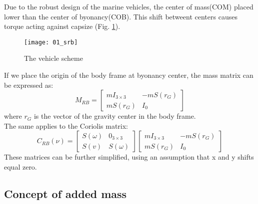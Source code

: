     Due to the robust design of the marine vehicles, the center of mass(COM) placed lower than the center of byonancy(COB).
    This shift betweent centers causes torque acting against capsize (Fig. \ref{image:scheme}).\\
    \begin{figure}[H]
        \centering\texttt{[image: 01\_srb]}
        \caption{The vehicle scheme}
        \label{image:scheme}
    \end{figure}
    If we place the origin of the body frame at byonancy center, the mass matrix can be expressed as:\\
    $$
    M_{R B}=\left[\begin{array}{cc}
        m I_{3 \times 3} & -m S\left(r_G\right) \\
        m S\left(r_G\right) & I_0
    \end{array}\right]
    $$
    where $r_G$ is the vector of the gravity center in the body frame.\\
    The same applies to the Coriolis matrix:
    $$
    C_{R B}(\nu) =\left[\begin{array}{cc}
        S(\omega) & 0_{3 \times 3} \\
        S(v) & S(\omega)
    \end{array}\right]\left[\begin{array}{cc}
        m I_{3 \times 3} & -m S\left(r_G\right) \\
        m S\left(r_G\right) & I_0
    \end{array}\right]
    $$
    These matrices can be further simplified, using an assumption that x and y shifts equal zero. 
\subsection*{Concept of added mass}

